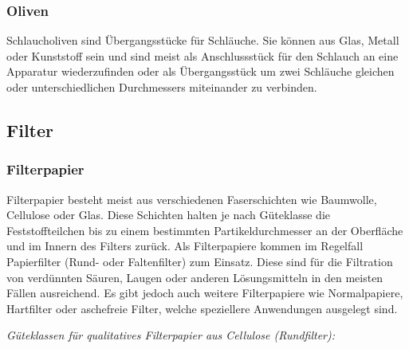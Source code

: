 \vspace{5mm}

\subsubsection{Oliven}
Schlaucholiven sind Übergangsstücke für Schläuche. Sie können aus Glas, Metall oder Kunststoff sein und sind meist als Anschlussstück für den Schlauch an eine Apparatur wiederzufinden oder als Übergangsstück um zwei Schläuche gleichen oder unterschiedlichen Durchmessers miteinander zu verbinden.


\subsection{Filter}
\subsubsection*{Filterpapier}
Filterpapier besteht meist aus verschiedenen Faserschichten wie Baumwolle, Cellulose oder Glas. Diese Schichten halten je nach Güteklasse die Feststoffteilchen bis zu einem bestimmten Partikeldurchmesser an der Oberfläche und im Innern des Filters zurück. Als Filterpapiere kommen im Regelfall Papierfilter (Rund- oder Faltenfilter) zum Einsatz. Diese sind für die Filtration von verdünnten Säuren, Laugen oder anderen Lösungsmitteln in den meisten Fällen ausreichend. Es gibt jedoch auch weitere Filterpapiere wie Normalpapiere, Hartfilter oder aschefreie Filter, welche speziellere Anwendungen ausgelegt sind.\\
\newpage

\textit{Güteklassen für qualitatives Filterpapier aus Cellulose (Rundfilter):}

